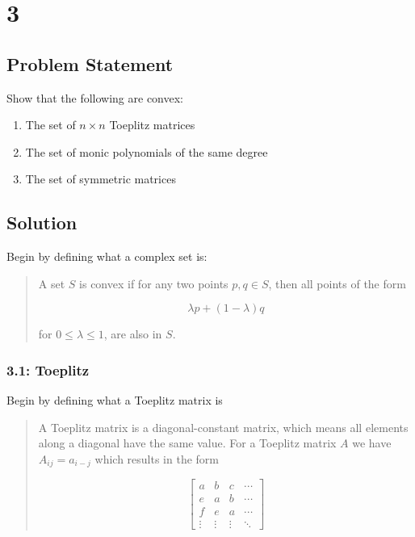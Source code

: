 \documentclass[11pt,a4paper,final]{article}
\begin{document}
\section{3}
\label{sec:org7158cf0}
\subsection{Problem Statement}
\label{sec:org1844730}
Show that the following are convex:

\begin{enumerate}
\item The set of \(n \times n\) Toeplitz matrices
\item The set of monic polynomials of the same degree
\item The set of symmetric matrices
\end{enumerate}

\subsection{Solution}
\label{sec:org719eedd}
Begin by defining what a complex set is:

\begin{quote}
A set \(S\) is convex if for any two points \(p,q \in S\), then all points of the form

$$
\lambda p + (1 - \lambda)q
$$

for \(0 \le \lambda \le 1\), are also in \(S\).
\end{quote}

\subsubsection{3.1: Toeplitz}
\label{sec:3.1}
Begin by defining what a Toeplitz matrix is

\begin{quote}
A Toeplitz matrix is a diagonal-constant matrix, which means all elements along a diagonal have the same value. For a
Toeplitz matrix \(A\) we have \(A_{ij} = a_{i-j}\) which results in the form

\begin{equation*}
\begin{bmatrix}
a & b & c & \cdots \\
e & a & b & \cdots \\
f & e & a & \cdots \\
\vdots & \vdots & \vdots & \ddots
\end{bmatrix}
\end{equation*}
\end{quote}
\end{document}
